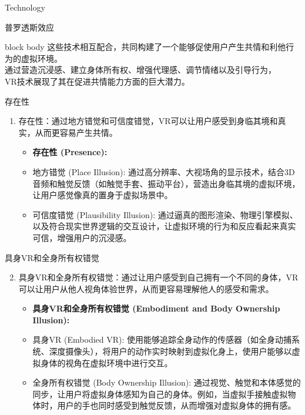 \documentclass[aspectratio=169,xcolor=dvipsnames]{beamer}
\begin{document}
\begin{frame}{Technology}
\begin{block}{\color{white!80!black}普罗透斯效应}
    \end{block}
    
    \vspace{0.3cm}
    
    \begin{beamercolorbox}[wd=0.9\textwidth,center,sep=4pt,rounded=true,shadow=true]{block body}
        \footnotesize
        这些技术相互配合，共同构建了一个能够促使用户产生共情和利他行为的虚拟环境。\\
        通过营造沉浸感、建立身体所有权、增强代理感、调节情绪以及引导行为，\\
        VR技术展现了其在促进共情能力方面的巨大潜力。
    \end{beamercolorbox}
\end{frame}


\begin{frame}{存在性}
    \begin{enumerate}
        \item 存在性：通过地方错觉和可信度错觉，VR可以让用户感受到身临其境和真实，从而更容易产生共情。
        \begin{itemize}
            \item \textbf{存在性 (Presence):}
            \item 地方错觉 (Place Illusion): 通过高分辨率、大视场角的显示技术，结合3D音频和触觉反馈（如触觉手套、振动平台），营造出身临其境的虚拟环境，让用户感觉像真的置身于虚拟场景中。
            \item 可信度错觉 (Plausibility Illusion): 通过逼真的图形渲染、物理引擎模拟、以及符合现实世界逻辑的交互设计，让虚拟环境的行为和反应看起来真实可信，增强用户的沉浸感。
        \end{itemize}
    \end{enumerate}
\end{frame}

\begin{frame}{具身VR和全身所有权错觉}
    \begin{enumerate}
        \setcounter{enumi}{1}
        \item 具身VR和全身所有权错觉：通过让用户感受到自己拥有一个不同的身体，VR可以让用户从他人视角体验世界，从而更容易理解他人的感受和需求。
        \begin{itemize}
            \item \textbf{具身VR和全身所有权错觉 (Embodiment and Body Ownership Illusion):}
            \item 具身VR (Embodied VR): 使用能够追踪全身动作的传感器（如全身动捕系统、深度摄像头），将用户的动作实时映射到虚拟化身上，使用户能够以虚拟身体的视角在虚拟环境中进行交互。
            \item 全身所有权错觉 (Body Ownership Illusion): 通过视觉、触觉和本体感觉的同步，让用户将虚拟身体感知为自己的身体。例如，当虚拟手接触虚拟物体时，用户的手也同时感受到触觉反馈，从而增强对虚拟身体的拥有感。
        \end{itemize}
    \end{enumerate}
\end{frame}
\end{document}

